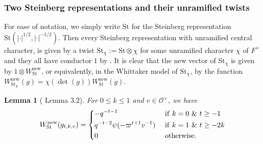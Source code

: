 \documentclass{amsart}
\theoremstyle{plain}
\newtheorem{lem}[thm]{Lemma}
\theoremstyle{plain}
\theoremstyle{remark}
\begin{document}
\subsubsection{Two Steinberg representations and their unramified twists}\label{unr StxSt}
For ease of notation, we simply write $\mathrm{St}$ for the Steinberg representation $\mathrm{St}(|\cdot|^{1/2},|\cdot|^{-1/2})$. Then every Steinberg representation with unramified central character, is given by a twist $\mathrm{St}_\chi:=\mathrm{St}\otimes \chi$ for some unramified character $\chi$ of $F^\times$ and they all have conductor $1$ by \cite{schmidt2002some}. It is clear that the new vector of $\mathrm{St}_\chi$ is given by $1\otimes W_\mathrm{St}^\mathrm{new}$, or equivalently, in the Whittaker model of $\mathrm{St}_\chi$, by the function $W_{\mathrm{St}_\chi}^\mathrm{new}(g)=\chi(\det(g))W_\mathrm{St}^\mathrm{new}(g)$.   


\begin{lem}[\cite{Assing_2018} Lemma $3.2$]\label{lem Assing for steinberg} For $0\leq 
 k\leq 1$ and $v\in \mathcal{O}^\times$, we have
$$W_\mathrm{St}^\mathrm{new}(g_{t,k,v})=\begin{dcases}
    -q^{-t-1}\ &\mathrm{if}\ k=0\ \& \ t\geq -1\\
    q^{-t-2}\psi(-\varpi^{t+1}v^{-1})\ &\mathrm{if}\ k= 1\ \& \ t\geq -2k\\
    0\ &\mathrm{otherwise}.
\end{dcases}$$
\end{lem}
\end{document}
